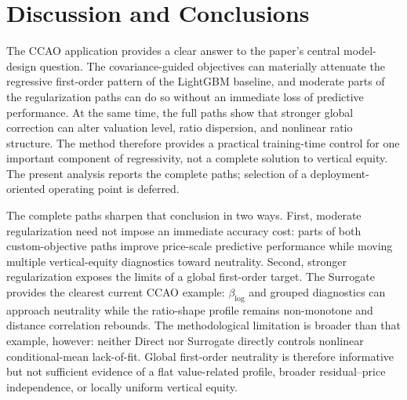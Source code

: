 \documentclass[10pt]{article}
\theoremstyle{definition}
\newcommand{\1}{\mathbf{1}}
\newcommand{\oldtext}[1]{\textcolor{blue}{\sout{#1}}}
\newcommand{\newtext}[1]{\textcolor{impGreen}{#1}}
\begin{document}
\section{Discussion and Conclusions}
\label{sec:discussion}

\newtext{The CCAO application provides a clear answer to the paper's central model-design question. The covariance-guided objectives can materially attenuate the regressive first-order pattern of the LightGBM baseline, and moderate parts of the regularization paths can do so without an immediate loss of predictive performance. At the same time, the full paths show that stronger global correction can alter valuation level, ratio dispersion, and nonlinear ratio structure. The method therefore provides a practical training-time control for one important component of regressivity, not a complete solution to vertical equity. The present analysis reports the complete paths; selection of a deployment-oriented operating point is deferred.}

The complete paths sharpen that conclusion in two ways. First, moderate
regularization need not impose an immediate accuracy cost: parts of both
custom-objective paths improve price-scale predictive performance while moving
multiple vertical-equity diagnostics toward neutrality. 
\newtext{Second, stronger regularization exposes the limits of a global first-order target. The Surrogate provides the clearest current CCAO example: $\beta_{\log}$ and grouped diagnostics can approach neutrality while the ratio-shape profile remains non-monotone and distance correlation rebounds. The methodological limitation is broader than that example, however: neither Direct nor Surrogate directly controls nonlinear conditional-mean lack-of-fit. Global first-order neutrality is therefore informative but not sufficient evidence of a flat value-related profile, broader residual--price independence, or locally uniform vertical equity.}
\end{document}
